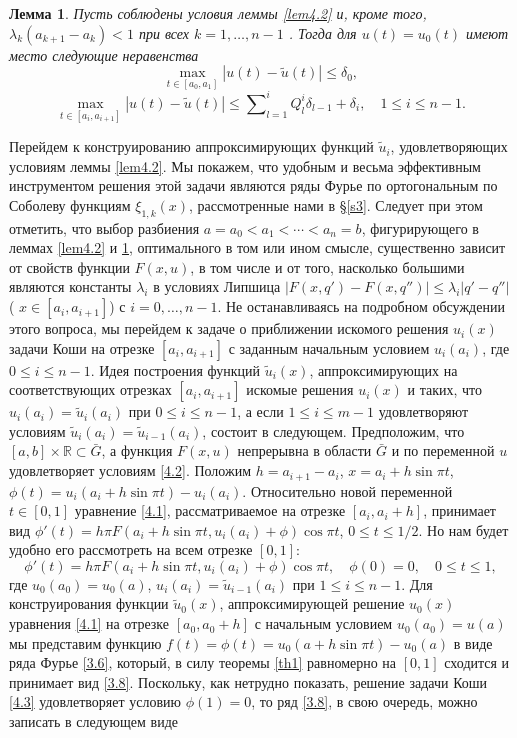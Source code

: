 \documentclass{article}
\numberwithin{equation}{section}
\theoremstyle{plain}
\newtheorem{lemma}{Лемма}[section]
\theoremstyle{definition}
\begin{document}
\begin{fulltext}
\begin{lemma}\label{lem4.3}
  Пусть соблюдены условия леммы \ref{lem4.2}   и, кроме того,\\ $\lambda_{k}(a_{k+1}-a_k)<1$ при всех $k=1,\ldots,n-1$ . Тогда для $u(t)=u_0(t)$  имеют место следующие неравенства
  $$
  \max_{t\in[a_0,a_1]}|u(t)-\tilde u(t)|\le \delta_0,
  $$
$$
\max_{t\in[a_i,a_{i+1}]}|u(t)-\tilde u(t)|\le\sum\nolimits_{l=1}^iQ_{l}^i\delta_{l-1}+\delta_i, \quad 1\le i\le n-1.
$$
\end{lemma}
Перейдем к конструированию аппроксимирующих  функций $\tilde u_i$, удовлетворяющих условиям  леммы \ref{lem4.2}. Мы покажем, что удобным и весьма эффективным инструментом  решения этой задачи являются ряды Фурье по ортогональным по Соболеву функциям $\xi_{1,k}(x)$, рассмотренные нами в \S \ref{s3}. Следует при этом отметить, что выбор разбиения $a=a_0<a_1<\cdots<a_n=b$, фигурирующего в леммах \ref{lem4.2} и \ref{lem4.3}, оптимального в том или ином смысле, существенно зависит от свойств функции $F(x,u)$, в том числе  и от того, насколько большими являются константы $\lambda_i$ в условиях Липшица $|F(x,q')-F(x,q'')|\le\lambda_i|q'-q''|$ (  $x\in [a_i,a_{i+1}]$) с $i=0,\ldots, n-1$. Не останавливаясь на подробном обсуждении этого вопроса, мы перейдем к задаче о приближении  искомого решения $u_i(x)$ задачи Коши на отрезке $[a_i,a_{i+1}]$ с заданным начальным условием $u_i(a_i)$, где $0\le i\le n-1$.
  Идея построения функций $\tilde u_i(x)$, аппроксимирующих на соответствующих отрезках $[a_i,a_{i+1}]$ искомые  решения $u_i(x)$ и таких, что $u_i(a_i)=\tilde u_i(a_i)$ при $0\le i\le n-1$, а если $1\le i\le m-1$ удовлетворяют условиям
  $\tilde u_i(a_i)= \tilde u_{i-1}(a_i)$, состоит в следующем.  Предположим, что $[a,b]\times\mathbb{R}\subset \bar G$, а  функция $F(x,u)$ непрерывна в области $\bar G$ и по переменной $u$  удовлетворяет условиям \eqref{4.2}. Положим $h=a_{i+1}-a_{i}$, $x=a_i+h\sin\pi t$, $\phi(t)=u_i(a_i+h\sin\pi t)-u_i(a_i)$. Относительно новой переменной $t\in [0,1]$ уравнение \eqref{4.1}, рассматриваемое на отрезке $[a_i,a_i+h]$,  принимает вид $\phi'(t)=h \pi F(a_i+h\sin\pi t,u_i(a_i)+\phi)\cos\pi t$,  $0\le t\le 1/2$. Но нам будет удобно его рассмотреть на всем отрезке $[0,1]$:
\begin{equation}\label{4.3}
\phi'(t)=h\pi F(a_i+h\sin\pi t,u_i(a_i)+\phi)\cos\pi t, \quad \phi(0)= 0,\quad 0\le t\le 1,
\end{equation}
где  $u_0(a_0)=u_0(a)$, $ u_i(a_i)= \tilde u_{i-1}(a_i)$ при $1\le i\le n-1$. Для конструирования функции $\tilde u_0(x)$, аппроксимирующей решение $u_0(x)$ уравнения \eqref{4.1} на отрезке $[a_0,a_0+h]$ с начальным условием $u_0(a_0)=u(a)$ мы представим функцию $f(t)=\phi(t)=u_0(a+h\sin\pi t)-u_0(a)$ в виде ряда Фурье \eqref{3.6}, который, в силу теоремы \ref{th1} равномерно на $[0,1]$ сходится и  принимает вид \eqref{3.8}. Поскольку, как нетрудно показать, решение задачи Коши \eqref{4.3} удовлетворяет условию $\phi(1)= 0$, то ряд \eqref{3.8}, в свою очередь, можно записать в следующем виде

\end{fulltext}
\end{document}
